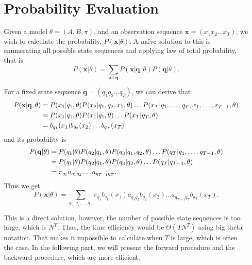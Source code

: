 \documentclass[12pt,final,twoside]{report}
\theoremstyle{plain}
\theoremstyle{definition}
\theoremstyle{remark}
\begin{document}
\section{Probability Evaluation}
Given a model $\theta=(A, B, \pi)$, and an observation sequence $\mathbf{x} = (x_1 x_2 \dots x_T)$, we wish to calculate the probability, $P(\mathbf{x}|\theta)$. A na\"ive solution to this is enumerating all possible state sequences and applying law of total probability, that is
\begin{equation}
  P(\mathbf{x}|\theta) = \sum_{\text{all } \mathbf{q}} P(\mathbf{x}|\mathbf{q},\theta) P(\mathbf{q}|\theta) .
\end{equation}

For a fixed state sequence $\mathbf{q} = (q_1 q_2 \dots q_T)$, we can derive that
\begin{align}
  P(\mathbf{x}|\mathbf{q},\theta) &= P(x_1|q_1,\theta) P(x_2|q_1,q_2,x_1,\theta) \dots P(x_T|q_1,\dots,q_T,x_1,\dots,x_{T-1},\theta) \notag\\
  &= P(x_1|q_1, \theta) P(x_1|q_1, \theta) \dots P(x_T|q_T, \theta) \notag\\
  &= b_{q_1}(x_1) b_{q_2}(x_2) \dots b_{q_T}(x_T)
\end{align}
and its probability is
\begin{align}
  P(\mathbf{q}|\theta) &= P(q_1|\theta) P(q_2|q_1,\theta) P(q_3|q_1,q_2,\theta) \dots P(q_T|q_1,\dots,q_{T-1},\theta) \notag\\
  &= P(q_1|\theta) P(q_2|q_1,\theta) P(q_3|q_2,\theta) \dots P(q_T|q_{T-1},\theta)  \notag\\
  &= \pi_{q_1} a_{q_1q_2} \dots a_{q_{T-1}q_T} .
\end{align}
Thus we get 
\begin{equation}
  P(\mathbf{x}|\theta) = \sum_{q_1,q_2,\dots,q_T} \pi_{q_1} b_{q_1}(x_1) a_{q_1q_2} b_{q_2}(x_2) \dots a_{q_{T-1}q_T} b_{a_T}(x_T) .
  \label{eq:prob_brute}
\end{equation}

This is a direct solution, however, the number of possible state sequences is too large, which is $N^T$. Thus, the time efficiency would be $\Theta(T N^T)$ using big theta notation. That makes it impossible to calculate when $T$ is large, which is often the case. In the following part, we will present the forward procedure and the backward procedure, which are more efficient.
\end{document}
